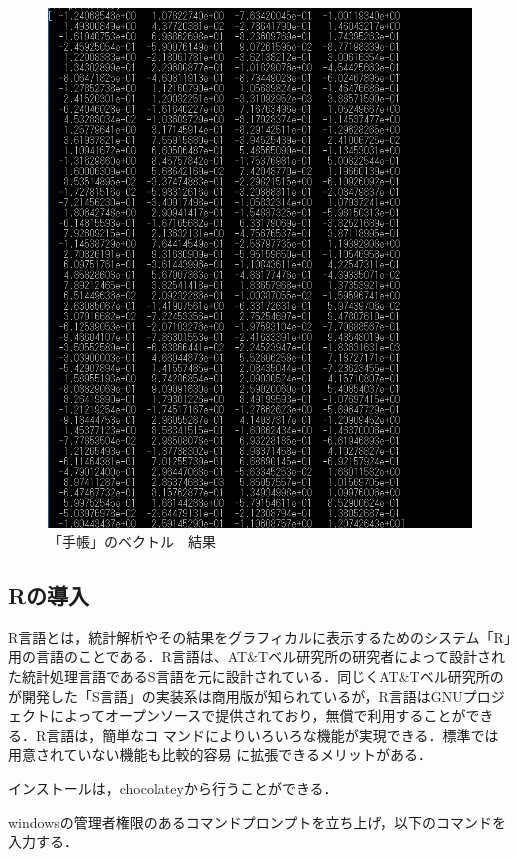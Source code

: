 \begin{figure}[htb]
\centering
\includegraphics[width=13cm]{4-30.png}
\caption{「手帳」のベクトル　結果}\label{4-30}
\end{figure}
\newpage

\subsection{Rの導入}
R言語とは，統計解析やその結果をグラフィカルに表示するためのシステム「R」用の言語のことである．R言語は、AT\&Tベル研究所の研究者によって設計された統計処理言語であるS言語を元に設計されている．同じくAT\&Tベル研究所のが開発した「S言語」の実装系は商用版が知られているが，R言語はGNUプロジェクトによってオープンソースで提供されており，無償で利用することができる．R言語は，簡単なコ マンドによりいろいろな機能が実現できる．標準では用意されていない機能も比較的容易 に拡張できるメリットがある．

インストールは，chocolateyから行うことができる．

windowsの管理者権限のあるコマンドプロンプトを立ち上げ，以下のコマンドを入力する．

